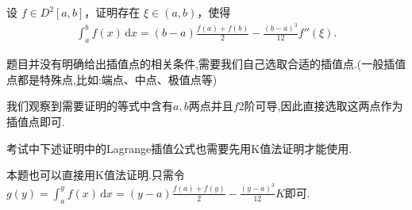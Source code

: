 \documentclass[../../main.tex]{subfiles}%
\begin{document}
\begin{example}
设 $f \in D^2[a,b]$，证明存在 $\xi \in (a,b)$，使得
\begin{align*}
\int_{a}^{b} f(x) \, \mathrm{d}x = (b - a) \frac{f(a) + f(b)}{2} - \frac{(b - a)^3}{12} f''(\xi).
\end{align*}
\end{example}
\begin{note}
题目并没有明确给出插值点的相关条件,需要我们自己选取合适的插值点.(一般插值点都是特殊点,比如:端点、中点、极值点等)

我们观察到需要证明的等式中含有$a,b$两点并且$f$2阶可导,因此直接选取这两点作为插值点即可.
\end{note}
\begin{remark}
考试中下述证明中的Lagrange插值公式也需要先用K值法证明才能使用.

本题也可以直接用K值法证明.只需令$g(y)=\int_a^y{f(x)\,\mathrm{d}x}=(y-a)\frac{f(a)+f(y)}{2}-\frac{(y-a)^3}{12}K$即可.
\end{remark}
\end{document}
